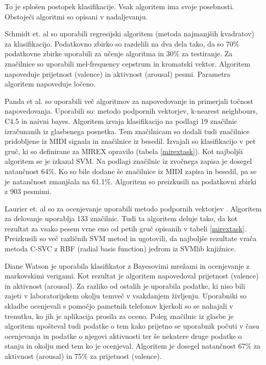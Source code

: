\documentclass[a4paper, 12pt]{book}
\begin{document}
{To je splošen postopek klasifikacije. Vsak algoritem ima svoje posebnosti. Obstoječi algoritmi so opisani v nadaljevanju. 

Schmidt et. al \cite{schmidt2009projection} so uporabili regresijski algoritem (metoda najmanjših kvadratov) za klasifikacijo. Podatkovno zbirko so razdelili na dva dela tako, da so 70\% podatkovne zbirke uporabili za učenje algoritma in 30\% za testiranje. Za značilnice so uporabili mel-frequency cepstrum in kromatski vektor. Algoritem napoveduje prijetnost (valence) in aktivnost (arousal) pesmi. Parametra algoritem napoveduje ločeno. 

Panda et al. \cite{panda2013multi} so uporabili več algoritmov za napovedovanje in primerjali točnost napovedovanja. Uporabili so: metodo podpornih vektorjev, k-nearest neighbours, C4.5 in naivni bayes. Algoritem izvaja klasifikacijo na podlagi 19 značilnic izračunanih iz glasbenega posnetka. Tem značilnicam so dodali tudi značilnice pridobljene iz MIDI signala in značilnice iz besedil. Izvajali so klasifikacijo v pet gruč, ki so definirane za MIREX opravilo (tabela \ref{mirextask}).  Kot najboljši algoritem se je izkazal SVM. Na podlagi značilnic iz zvočnega zapisa je dosegel natančnost 64\%. Ko so bile dodane še značilnice iz MIDI zapisa in besedil, pa se je natančnost zmanjšala na 61.1\%. Algoritem so preizkusili na podatkovni zbirki z 903 pesmimi. 

Laurier et. al \cite{laurier2007audio} so za ocenjevanje uporabili metodo podpornih vektorjev \cite{ben2010user}. Algoritem za delovanje uporablja 133 značilnic. Tudi ta algoritem deluje tako, da kot rezultat za vsako pesem vrne eno od petih gruč opisanih v tabeli \ref{mirextask}. Preizkusili so več različnih SVM metod in ugotovili, da najboljše rezultate vrača metoda C-SVC z RBF (radial basis function) jedrom iz SVMlib knjižnice. 

Diane Watson \cite{watson2012modeling} je uporabila klasifikator z Bayesovimi mrežami in ocenjevanje z markovskimi verigami. Kot rezultat je algoritem napovedoval prijetnost (valence) in aktivnost (arousal). Za razliko od ostalih je uporabila podatke, ki niso bili zajeti v laboratorijskem okolju temveč v vsakdanjem življenju. Uporabniki so skladbe ocenjevali s pomočjo pametnih telefonov kjerkoli so se nahajali v trenutku, ko jih je aplikacija prosila za oceno. Poleg značilnic iz glasbe je algoritem upošteval tudi podatke o tem kako prijetno se uporabnik počuti v času ocenjevanja in podatke o njegovi aktivnosti ter še nekatere druge podatke o stanju in okolju med tem ko je ocenjeval. Algoritem je dosegel natančnost 67\% za aktivnost (arousal) in 75\% za prijetnost (valence). 

}
\end{document}

